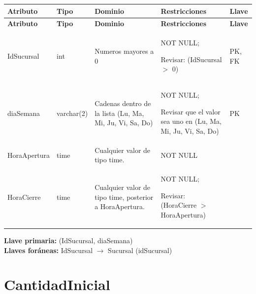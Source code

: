 \documentclass[12pt]{article}
\begin{document}
\begin{longtable}{p{2.7cm} p{2.2cm} p{4.8cm} p{4.2cm} p{1.2cm}}
\label{tab:diaapertura}\\
\toprule
\textbf{Atributo} & \textbf{Tipo} & \textbf{Dominio} & \textbf{Restricciones} & \textbf{Llave} \\
\midrule
\endfirsthead

\toprule
\textbf{Atributo} & \textbf{Tipo} & \textbf{Dominio} & \textbf{Restricciones} & \textbf{Llave} \\
\midrule
\endhead

\bottomrule
\endfoot


IdSucursal 
& int 
& Numeros mayores a 0
& NOT NULL;

Revisar: (IdSucursal $>$ 0)
& PK, FK \\

diaSemana 
& varchar(2) 
& Cadenas dentro de la lista (Lu, Ma, Mi, Ju, Vi, Sa, Do)
& NOT NULL;

Revisar que el valor sea uno en (Lu, Ma, Mi, Ju, Vi, Sa, Do)
& PK \\

HoraApertura 
& time 
& Cualquier valor de tipo time.
& NOT NULL
&  \\

HoraCierre 
& time 
& Cualquier valor de tipo time, posterior a HoraApertura.
& NOT NULL;

Revisar: (HoraCierre $>$ HoraApertura)
&  \\

\end{longtable}

\textbf{Llave primaria:} (IdSucursal, diaSemana)\\
\textbf{Llaves foráneas:} IdSucursal $\rightarrow$ Sucursal (idSucursal)

 

\section*{CantidadInicial}
\end{document}
